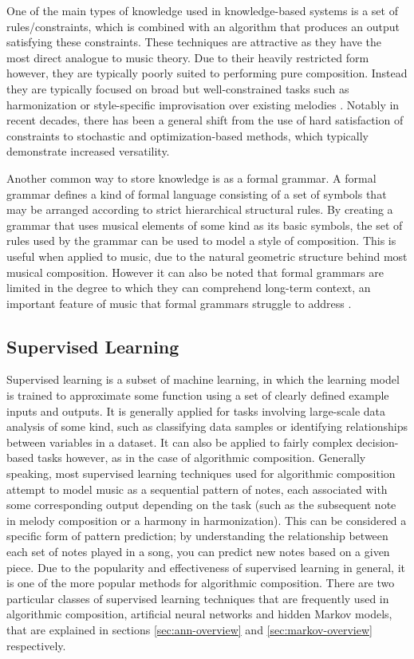 \documentclass[ author={Stephen Livermore-Tozer},
				supervisor={Dr. Peter Flach},
				degree={MEng},
				title={Algorithmic Co-composition Using Machine Learning},
				subtitle={},
				type={research},
				year={2016} ]{dissertation}
\begin{document}
	One of the main types of knowledge used in knowledge-based systems is a set of rules/constraints, which is combined with an algorithm that produces an output satisfying these constraints. These techniques are attractive as they have the most direct analogue to music theory. Due to their heavily restricted form however, they are typically poorly suited to performing pure composition. Instead they are typically focused on broad but well-constrained tasks such as harmonization \cite{thomas1985vivace} or style-specific improvisation over existing melodies \cite{horowitz1995representing}. Notably in recent decades, there has been a general shift from the use of hard satisfaction of constraints to stochastic and optimization-based methods, which typically demonstrate increased versatility.
	
	Another common way to store knowledge is as a formal grammar. A formal grammar defines a kind of formal language consisting of a set of symbols that may be arranged according to strict hierarchical structural rules. By creating a grammar that uses musical elements of some kind as its basic symbols, the set of rules used by the grammar can be used to model a style of composition. This is useful when applied to music, due to the natural geometric structure behind most musical composition. However it can also be noted that formal grammars are limited in the degree to which they can comprehend long-term context, an important feature of music that formal grammars struggle to address \cite{moorer1972music}.	 
	
	\subsection{Supervised Learning}
	\label{sec:supervised-learning}
	
	Supervised learning is a subset of machine learning, in which the learning model is trained to approximate some function using a set of clearly defined example inputs and outputs. It is generally applied for tasks involving large-scale data analysis of some kind, such as classifying data samples or identifying relationships between variables in a dataset. It can also be applied to fairly complex decision-based tasks however, as in the case of algorithmic composition. Generally speaking, most supervised learning techniques used for algorithmic composition attempt to model music as a sequential pattern of notes, each associated with some corresponding output depending on the task (such as the subsequent note in melody composition or a harmony in harmonization). This can be considered a specific form of pattern prediction; by understanding the relationship between each set of notes played in a song, you can predict new notes based on a given piece. Due to the popularity and effectiveness of supervised learning in general, it is one of the more popular methods for algorithmic composition. There are two particular classes of supervised learning techniques that are frequently used in algorithmic composition, artificial neural networks and hidden Markov models, that are explained in sections \ref{sec:ann-overview} and \ref{sec:markov-overview} respectively.
	
\end{document}
